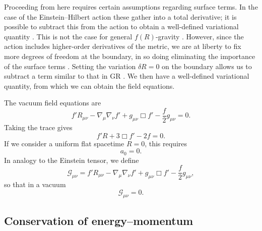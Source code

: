 Proceeding from here requires certain assumptions regarding surface terms. In the case of the Einstein--Hilbert action these gather into a total derivative; it is possible to subtract this from the action to obtain a well-defined variational quantity \citep{York1972Jr, Gibbons1977}. This is not the case for general $f(R)$-gravity \citep{Madsen1989}. However, since the action includes higher-order derivatives of the metric, we are at liberty to fix more degrees of freedom at the boundary, in so doing eliminating the importance of the surface terms \citep{Dyer2009a, Sotiriou2010}. Setting the variation $\delta R = 0$ on the boundary allows us to subtract a term similar to that in GR \citep{Guarnizo2010}. We then have a well-defined variational quantity, from which we can obtain the field equations.

The vacuum field equations are
\begin{equation}
f'R_{\mu\nu} - \nabla_\mu\nabla_\nu f' + g_{\mu\nu}\Box f' - \dfrac{f}{2}g_{\mu\nu} = 0.
\label{eq:Field_eq}
\end{equation}
Taking the trace gives
\begin{equation}
f'R + 3\Box f' - 2f = 0.
\label{eq:Trace_eq}
\end{equation}
If we consider a uniform flat spacetime $R = 0$, this requires \citep{Capozziello2007}
\begin{equation}
a_0 = 0.
\label{eq:a_0}
\end{equation}
In analogy to the Einstein tensor, we define
\begin{equation}
\mathcal{G}_{\mu\nu} = f'R_{\mu\nu} - \nabla_\mu\nabla_\nu f' + g_{\mu\nu}\Box f' - \dfrac{f}{2}g_{\mu\nu},
\label{eq:G_tensor}
\end{equation}
so that in a vacuum
\begin{equation}
\mathcal{G}_{\mu\nu} = 0.
\end{equation}

\subsection{Conservation of energy--momentum}

